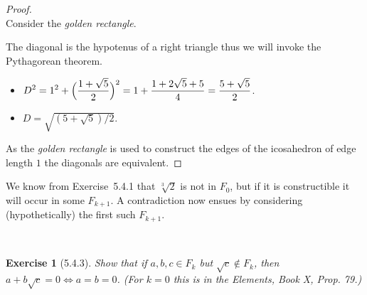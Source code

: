 \documentclass[12pt]{article}
\newcommand{\XB}{\color{black}}
\newcommand{\XBB}{\color{blue}}
\newcommand{\ds}{\displaystyle}
\theoremstyle{plain}
\newtheorem{ex}{Exercise}
\begin{document}
\begin{proof}
  \ \\

  Consider the \textit{golden rectangle}. \\
  \begin{center}
  \end{center}

  The diagonal is the hypotenus of a right triangle thus we will invoke the Pythagorean theorem.

  \begin{itemize}
    \item $ \ds D^{2} = 1^{2} + \Bigl( \frac{1 + \sqrt{5}}{2} \Bigr)^{2} =  1 + \frac{1 + 2\sqrt{5} + 5}{4} = \frac{5 + \sqrt{5}}{2} $.
    \item $ \ds D = \sqrt{(5 + \sqrt{5})/2} $.
  \end{itemize}

  As the \textit{golden rectangle} is used to construct the edges of the icosahedron of edge length $ 1 $ the diagonals are equivalent.

\end{proof}

\newpage


We know from Exercise~5.4.1 that $ \sqrt[3]{2} $ is not in $ F_{0} $, but if it is constructible it will occur in some $ F_{k + 1} $. A contradiction now ensues by considering (hypothetically) the first such $ F_{k + 1} $.

\XBB\hrulefill\XB \\
\begin{ex} [5.4.3]
  Show that if $ a, b, c \in F_{k} $ but $ \sqrt{c} \notin F_{k} $, then $ a + b\sqrt{c} = 0 \Leftrightarrow a = b = 0 $. (For $ k = 0 $ this is in the \emph{Elements}, Book X, Prop. 79.)
\end{ex}
\XBB\hrulefill\XB \\
\end{document}
